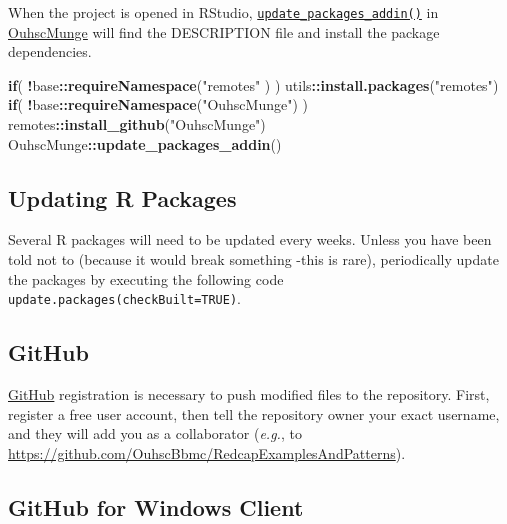 \documentclass[
]{book}
\newenvironment{Shaded}{\begin{snugshade}}{\end{snugshade}}
\newcommand{\ControlFlowTok}[1]{\textcolor[rgb]{0.13,0.29,0.53}{\textbf{#1}}}
\newcommand{\KeywordTok}[1]{\textcolor[rgb]{0.13,0.29,0.53}{\textbf{#1}}}
\newcommand{\NormalTok}[1]{#1}
\newcommand{\OperatorTok}[1]{\textcolor[rgb]{0.81,0.36,0.00}{\textbf{#1}}}
\newcommand{\StringTok}[1]{\textcolor[rgb]{0.31,0.60,0.02}{#1}}
\begin{document}
When the project is opened in RStudio, \href{http://ouhscbbmc.github.io/OuhscMunge/reference/update_packages_addin.html}{\texttt{update\_packages\_addin()}} in \href{https://ouhscbbmc.github.io/OuhscMunge}{OuhscMunge} will find the DESCRIPTION file and install the package dependencies.

\begin{Shaded}
\begin{Highlighting}[]
\ControlFlowTok{if}\NormalTok{( }\OperatorTok{!}\NormalTok{base}\OperatorTok{::}\KeywordTok{requireNamespace}\NormalTok{(}\StringTok{"remotes"}\NormalTok{   ) ) utils}\OperatorTok{::}\KeywordTok{install.packages}\NormalTok{(}\StringTok{"remotes"}\NormalTok{)}
\ControlFlowTok{if}\NormalTok{( }\OperatorTok{!}\NormalTok{base}\OperatorTok{::}\KeywordTok{requireNamespace}\NormalTok{(}\StringTok{"OuhscMunge"}\NormalTok{) ) remotes}\OperatorTok{::}\KeywordTok{install\_github}\NormalTok{(}\StringTok{"OuhscMunge"}\NormalTok{)}
\NormalTok{OuhscMunge}\OperatorTok{::}\KeywordTok{update\_packages\_addin}\NormalTok{()}
\end{Highlighting}
\end{Shaded}

\hypertarget{updating-r-packages}{%
\subsection{Updating R Packages}\label{updating-r-packages}}

Several R packages will need to be updated every weeks. Unless you have been told not to (because it would break something -this is rare), periodically update the packages by executing the following code \texttt{update.packages(checkBuilt=TRUE)}.

\hypertarget{github-1}{%
\subsection{GitHub}\label{github-1}}

\href{https://github.com/}{GitHub} registration is necessary to push modified files to the repository. First, register a free user account, then tell the repository owner your exact username, and they will add you as a collaborator (\emph{e.g.}, to \url{https://github.com/OuhscBbmc/RedcapExamplesAndPatterns}).

\hypertarget{github-for-windows-client}{%
\subsection{GitHub for Windows Client}\label{github-for-windows-client}}
\end{document}
